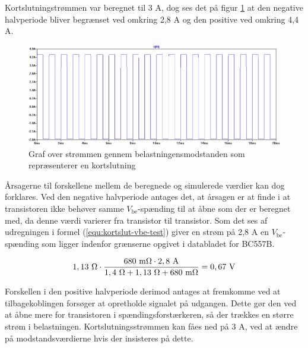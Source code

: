 Kortslutningstrømmen var beregnet til 3 A, dog ses det på figur \ref{fig:kortslut-graf} at den negative halvperiode bliver begrænset ved omkring 2,8 A og den positive ved omkring 4,4 A.

\begin{figure}[h]
\centering
\includegraphics[width=\textwidth]{teknisk/effektforstaerker/kortslut-graf.png}
\caption{Graf over strømmen gennem belastningensmodstanden som repræsenterer en kortslutning}
\label{fig:kortslut-graf}
\end{figure}

Årsagerne til forskellene mellem de beregnede og simulerede værdier kan dog forklares. Ved den negative halvperiode antages det, at årsagen er at finde i at transistoren ikke behøver samme $V_\mathrm{be}$-spænding til at åbne som der er beregnet med, da denne værdi varierer fra transistor til transistor. Som det ses af udregningen i formel (\ref{equ:kortslut-vbe-test}) giver en strøm på 2,8 A en $V_\mathrm{be}$-spænding som ligger indenfor grænserne opgivet i databladet for BC557B.

\begin{equation}
\label{equ:kortslut-vbe-test}
1,13~\ohm \cdot \frac{\mathrm{680~m\ohm} \cdot \mathrm{2,8~A}}{1,4~\ohm + 1,13~\ohm + \mathrm{680~m\ohm}} = \mathrm{0,67~V}
\end{equation}

Forskellen i den positive halvperiode derimod antages at fremkomme ved at tilbagekoblingen forsøger at opretholde signalet på udgangen. Dette gør den ved at åbne mere for transistoren i spændingsforstærkeren, så der trækkes en større strøm i belastningen. Kortslutningsstrømmen kan fåes ned på 3 A, ved at ændre på modstandsværdierne hvis der insisteres på dette. 